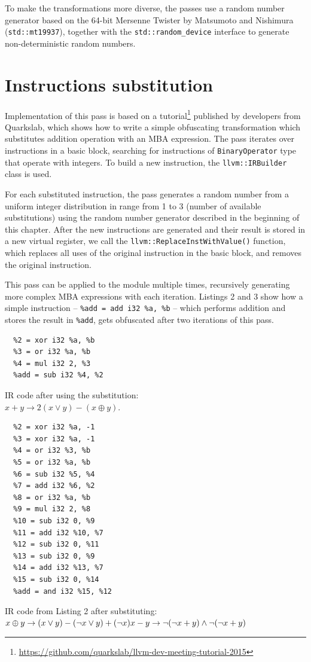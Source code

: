 \documentclass[
  digital, %
  notable,   %
  twoside, %
  nolof,     %
  nolot,     %
]{fithesis3}
\theoremstyle{definition}
\begin{document}
To make the transformations more diverse, the passes use a random number generator based on the 64-bit Mersenne Twister by Matsumoto and Nishimura (\texttt{std::mt19937}), together with the \texttt{std::random\_device} interface to generate non-deterministic random numbers.
\section{Instructions substitution}
Implementation of this pass is based on a tutorial\footnote{\url{https://github.com/quarkslab/llvm-dev-meeting-tutorial-2015}} published by developers from Quarkslab, which shows how to write a simple obfuscating transformation which substitutes addition operation with an MBA expression. 
The pass iterates over instructions in a basic block, searching for instructions of \texttt{BinaryOperator} type that operate with integers. To build a new instruction, the \texttt{llvm::IRBuilder} class is used. 

For each substituted instruction, the pass generates a random number from a uniform integer distribution in range from 1 to 3 (number of available substitutions) using the random number generator described in the beginning of this chapter. After the new instructions are generated and their result is stored in a new virtual register, we call the \texttt{llvm::ReplaceInstWithValue()} function, which replaces all uses of the original instruction in the basic block, and removes the original instruction. 

This pass can be applied to the module multiple times, recursively generating more complex MBA expressions with each iteration. Listings 2 and 3 show how a simple instruction -- \texttt{\%add = add i32 \%a, \%b} -- which performs addition and stores the result in \texttt{\%add}, gets obfuscated after two iterations of this pass.

\begin{listing}
\begin{verbatim}
  %2 = xor i32 %a, %b
  %3 = or i32 %a, %b
  %4 = mul i32 2, %3
  %add = sub i32 %4, %2  
\end{verbatim}
\label{lst:sub1}
\caption{IR code after using the substitution:\\ $x+y \rightarrow 2(x \vee y) - (x \oplus y)$.}
\end{listing}

\begin{listing}
\begin{verbatim}
  %2 = xor i32 %a, -1
  %3 = xor i32 %a, -1
  %4 = or i32 %3, %b
  %5 = or i32 %a, %b
  %6 = sub i32 %5, %4
  %7 = add i32 %6, %2
  %8 = or i32 %a, %b
  %9 = mul i32 2, %8
  %10 = sub i32 0, %9
  %11 = add i32 %10, %7
  %12 = sub i32 0, %11
  %13 = sub i32 0, %9
  %14 = add i32 %13, %7
  %15 = sub i32 0, %14
  %add = and i32 %15, %12 
\end{verbatim}
\label{lst:sub2}
\caption{IR code from Listing 2 after substituting:\\
$x\oplus y \rightarrow(x \vee y)-(\neg x \vee y)+(\neg x)\\
x - y \rightarrow \neg ( \neg x + y) \wedge \neg(\neg x + y)$}
\end{listing}
\end{document}
